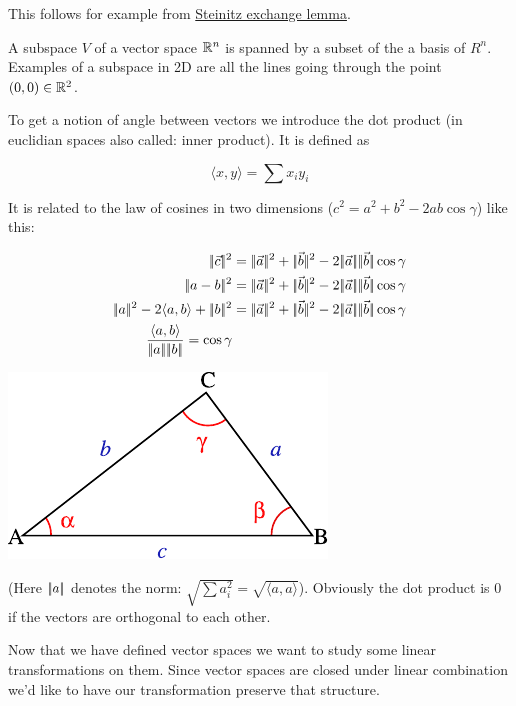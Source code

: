 This follows for example from \href{http://en.wikipedia.org/wiki/Steinitz_exchange_lemma}{Steinitz exchange lemma}.

\begin{Def}[Subspace]
 A subspace $V$ of a vector space $\mathbb{R}^n$ is spanned by a subset of the a basis of $R^n$. Examples of a subspace in 2D are all the lines going through the point $(0,0) \in \mathbb{R}^2$.
\end{Def}

To get a notion of angle between vectors we introduce the dot product (in euclidian spaces also called: inner product). It is defined as

\[\langle x,y\rangle  = \sum x_iy_i\]

It is related to the law of cosines in two dimensions ($c^2 = a^2+b^2-2ab\cos \gamma$) like this:

\begin{minipage}[hbt]{0.5\linewidth}
\begin{align*}
\norm{\vec c}^2 &= \norm{\vec a}^2 + \norm{\vec b}^2 -2\norm{\vec a}\norm{\vec b}\cos \gamma\\
\norm{a-b}^2 &= \norm{\vec a}^2 + \norm{\vec b}^2 -2\norm{\vec a}\norm{\vec b}\cos \gamma\\
\norm{a}^2-2\langle a,b\rangle +\norm{b}^2 &= \norm{\vec a}^2 + \norm{\vec b}^2 -2\norm{\vec a}\norm{\vec b}\cos \gamma\\
\frac{\langle a,b\rangle }{\norm{a}\norm{b}} = \cos \gamma
\end{align*}
\end{minipage}
\hfill
\begin{minipage}[hbt]{0.3\linewidth}
\includegraphics[scale=0.8]{./images/Triangle_with_notations_2.pdf}
\end{minipage}

(Here $|\!|a|\!|$ denotes the norm: $\sqrt{\sum a_i^2} = \sqrt{\langle a,a\rangle }$). Obviously the dot product is 0 if the vectors are orthogonal to each other.

Now that we have defined vector spaces we want to study some linear transformations on them. Since vector spaces are closed under linear combination we'd like to have our transformation preserve that structure.

